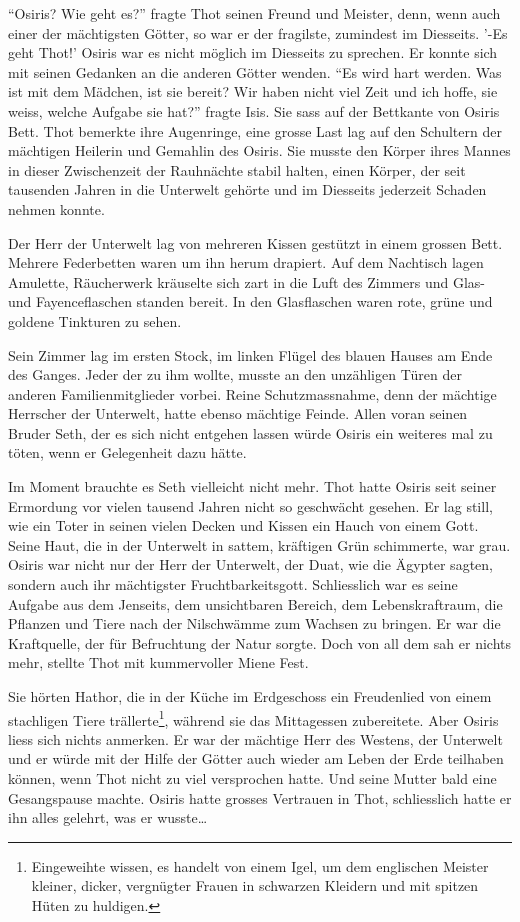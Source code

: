\documentclass[11pt,titlepage,a5paper]{book}
\begin{document}
"`Osiris? Wie geht es?"' fragte Thot seinen Freund und Meister, denn, wenn auch einer der mächtigsten Götter, so war er der fragilste, zumindest im Diesseits. '-Es geht Thot!' Osiris war es nicht möglich im Diesseits zu sprechen. Er konnte sich mit seinen Gedanken an die anderen Götter wenden.  "`Es wird hart werden. Was ist mit dem Mädchen, ist sie bereit? Wir haben nicht viel Zeit und ich hoffe, sie weiss, welche Aufgabe sie hat?"'  fragte Isis. Sie sass auf der Bettkante von Osiris Bett. Thot bemerkte ihre Augenringe, eine grosse Last lag auf den Schultern der mächtigen Heilerin und Gemahlin des Osiris. Sie musste den Körper ihres Mannes in dieser Zwischenzeit der Rauhnächte stabil halten, einen Körper, der seit tausenden Jahren in die Unterwelt gehörte und im Diesseits jederzeit Schaden nehmen konnte. 

Der Herr der Unterwelt lag von mehreren Kissen gestützt in einem grossen Bett. Mehrere Federbetten waren um ihn herum drapiert. Auf dem Nachtisch lagen Amulette, Räucherwerk kräuselte sich zart in die Luft des Zimmers und Glas- und Fayenceflaschen standen bereit. In den Glasflaschen waren rote, grüne und goldene Tinkturen zu sehen. 

Sein Zimmer lag im ersten Stock, im linken Flügel des blauen Hauses am Ende des Ganges. Jeder der zu ihm wollte, musste an den unzähligen Türen der anderen Familienmitglieder vorbei. Reine Schutzmassnahme, denn der mächtige Herrscher der Unterwelt, hatte ebenso mächtige Feinde. Allen voran seinen Bruder Seth, der es sich nicht entgehen lassen würde Osiris ein weiteres mal zu töten, wenn er Gelegenheit dazu hätte. 

Im Moment brauchte es Seth vielleicht nicht mehr. Thot hatte Osiris seit seiner Ermordung vor vielen tausend Jahren nicht so geschwächt gesehen. Er lag still, wie ein Toter in seinen vielen Decken und Kissen ein Hauch von einem Gott. Seine Haut, die in der Unterwelt in sattem, kräftigen Grün schimmerte, war grau. Osiris war nicht nur der Herr der Unterwelt, der Duat, wie die Ägypter sagten, sondern auch ihr mächtigster Fruchtbarkeitsgott. Schliesslich war es seine Aufgabe aus dem Jenseits, dem unsichtbaren Bereich, dem Lebenskraftraum, die Pflanzen und Tiere nach der Nilschwämme zum Wachsen zu bringen. Er war die Kraftquelle, der für Befruchtung der Natur sorgte. Doch von all dem sah er nichts mehr, stellte Thot mit kummervoller Miene Fest.

Sie hörten Hathor, die in der Küche im Erdgeschoss ein Freudenlied von einem stachligen Tiere trällerte\footnote{Eingeweihte wissen, es handelt von einem Igel, um dem englischen Meister kleiner, dicker, vergnügter Frauen in schwarzen Kleidern und mit spitzen Hüten zu huldigen.}, während sie das Mittagessen zubereitete. Aber Osiris liess sich nichts anmerken. Er war der mächtige Herr des Westens, der Unterwelt und er würde mit der Hilfe der Götter auch wieder am Leben der Erde teilhaben können, wenn Thot nicht zu viel versprochen hatte. Und seine Mutter bald eine Gesangspause machte. Osiris hatte grosses Vertrauen in Thot, schliesslich hatte er ihn alles gelehrt, was er wusste\dots
 
\end{document}
